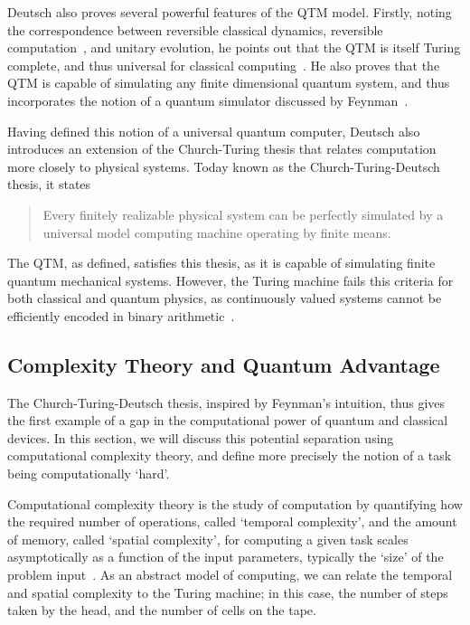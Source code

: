 Deutsch also proves several powerful features of the QTM model. Firstly, noting the correspondence between reversible classical dynamics, reversible computation~\cite{Toffoli1980}, and unitary evolution, he points out that the QTM is itself Turing complete, and thus universal for classical computing~\cite{Deutsch1985}. He also proves that the QTM is capable of simulating any finite dimensional quantum system, and thus incorporates the notion of a quantum simulator discussed by Feynman~\cite{Deutsch1985}.\par
Having defined this notion of a universal quantum computer, Deutsch also introduces an extension of the Church-Turing thesis that relates computation more closely to physical systems. Today known as the Church-Turing-Deutsch thesis, it states
\begin{quote}
Every finitely realizable physical system can be perfectly simulated by a universal model computing machine operating by finite means.
\end{quote}
The QTM, as defined, satisfies this thesis, as it is capable of simulating finite quantum mechanical systems. However, the Turing machine fails this criteria for both classical and quantum physics, as continuously valued systems cannot be efficiently encoded in binary arithmetic~\cite{Deutsch1985}.
\subsection{Complexity Theory and Quantum Advantage}\label{sec:complexity}
The Church-Turing-Deutsch thesis, inspired by Feynman's intuition, thus gives the first example of a gap in the computational power of quantum and classical devices. In this section, we will discuss this potential separation using computational complexity theory, and define more precisely the notion of a task being computationally `hard'.\par
Computational complexity theory is the study of computation by quantifying how the required number of operations, called `temporal complexity', and the amount of memory, called `spatial complexity', for computing a given task scales asymptotically as a function of the input parameters, typically the `size' of the problem input~\cite{Nielsen2000}. As an abstract model of computing, we can relate the temporal and spatial complexity to the Turing machine; in this case, the number of steps taken by the head, and the number of cells on the tape.\par
